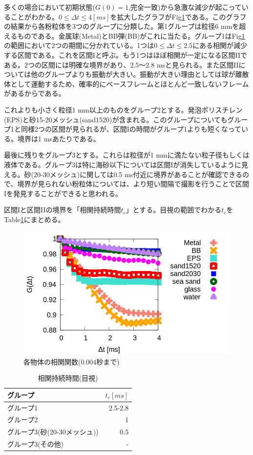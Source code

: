 \documentclass[a4paper,10pt,twocolumn,dvipdfmx]{jsarticle}
\newcommand{\Dt}{\Delta t}
\newcommand{\II}{I\hspace{-.1em}I}
\begin{document}
多くの場合において初期状態($G(0)=1$,完全一致)から急激な減少が起こっていることがわかる。$0 \leq \Delta t \leq 4 [ms]$を拡大したグラフがFig\ref{fig:init}である。このグラフの結果から各粉粒体を3つのグループに分類した。第1グループは粒径6 mmを超えるものである。金属球(Metal)とBB弾(BB)がこれに当たる。グループ1はFig\ref{fig:init}の範囲において2つの期間に分かれている。1つは$0 \leq \Dt \leq 2.5$にある相関が減少する区間である。これを区間Iと呼ぶ。もう1つはほぼ相関が一定になる区間\II である。2つの区間には明確な境界があり、2.5〜2.8 msと見られる。また区間\II については他のグループよりも振動が大きい。振動が大きい理由としては球が離散体として運動するため、確率的にベースフレームとほとんど一致しないフレームがあるからである。 \par
これよりも小さく粒径1 mm以上のものをグループ2とする。発泡ポリスチレン(EPS)と砂15-20メッシュ(sand1520)が含まれる。このグループについてもグループ1と同様2つの区間が見られるが、区間Iの時間がグループ1よりも短くなっている。境界は1 msあたりである。 \par
最後に残りをグループ3とする。これらは粒径が1 mmに満たない粒子径もしくは液体である。グループ3は特に海砂以下については区間Iが消失しているように見える。砂(20-30メッシュ)に関しては0.5 ms付近に境界があることが確認できるので、境界が見られない粉粒体については、より短い間隔で撮影を行うことで区間Iを発見することができると思われる。\par
区間Iと区間\II の境界を「相関持続時間$t_c$」とする。目視の範囲でわかる$t_c$をTable\ref{tb:tc_eye}にまとめる。
\begin{figure}[H]
	\includegraphics[scale=0.4]{init.png}
	\caption{各物体の相関関数(0.004秒まで)}
	\label{fig:init}
\end{figure}

\begin{table}[H]
	\caption{相関持続時間(目視) \label{tb:tc_eye}}
	\begin{tabular}{lr}
		\toprule
		グループ & $t_c [ms]$ \\
		\midrule
		グループ1 & 2.5-2.8 \\
		グループ2 & 1 \\
		グループ3(砂(20-30メッシュ)) & 0.5 \\
		グループ3(その他) & - \\
		\bottomrule
	\end{tabular}
\end{table}
\end{document}
